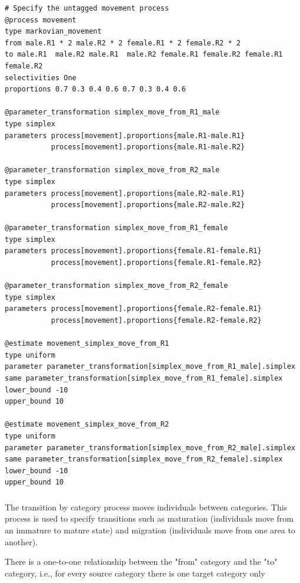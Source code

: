 {\small{\begin{verbatim}
# Specify the untagged movement process
@process movement
type markovian_movement
from male.R1 * 2 male.R2 * 2 female.R1 * 2 female.R2 * 2
to male.R1  male.R2 male.R1  male.R2 female.R1 female.R2 female.R1  female.R2
selectivities One
proportions 0.7 0.3 0.4 0.6 0.7 0.3 0.4 0.6

@parameter_transformation simplex_move_from_R1_male
type simplex
parameters process[movement].proportions{male.R1-male.R1}
           process[movement].proportions{male.R1-male.R2}

@parameter_transformation simplex_move_from_R2_male
type simplex
parameters process[movement].proportions{male.R2-male.R1}
           process[movement].proportions{male.R2-male.R2}
			
@parameter_transformation simplex_move_from_R1_female
type simplex
parameters process[movement].proportions{female.R1-female.R1} 
           process[movement].proportions{female.R1-female.R2}

@parameter_transformation simplex_move_from_R2_female
type simplex
parameters process[movement].proportions{female.R2-female.R1} 
           process[movement].proportions{female.R2-female.R2}

@estimate movement_simplex_move_from_R1
type uniform
parameter parameter_transformation[simplex_move_from_R1_male].simplex
same parameter_transformation[simplex_move_from_R1_female].simplex
lower_bound -10
upper_bound 10

@estimate movement_simplex_move_from_R2
type uniform
parameter parameter_transformation[simplex_move_from_R2_male].simplex
same parameter_transformation[simplex_move_from_R2_female].simplex
lower_bound -10
upper_bound 10
\end{verbatim}}}

\subsubsection{}\label{sec:Process-TransitionCategory}\label{sec:Process-Maturation}

The transition by category process moves individuals between categories. This process is used to specify transitions such as maturation (individuals move from an immature to mature state) and migration (individuals move from one area to another).

There is a one-to-one relationship between the "from" category and the "to" category, i.e., for every source category there is one target category only


